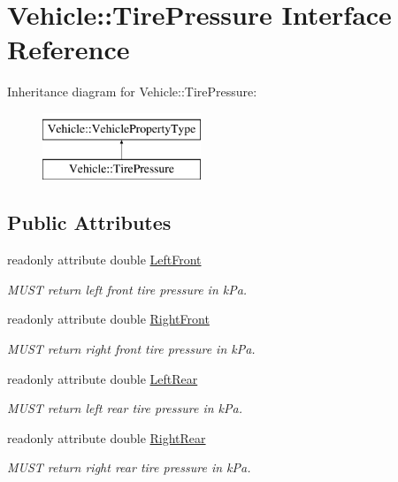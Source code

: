 \hypertarget{interfaceVehicle_1_1TirePressure}{\section{Vehicle\-:\-:Tire\-Pressure Interface Reference}
\label{interfaceVehicle_1_1TirePressure}
}
Inheritance diagram for Vehicle\-:\-:Tire\-Pressure\-:\begin{figure}[H]
\begin{center}
\leavevmode
\includegraphics[height=2.000000cm]{interfaceVehicle_1_1TirePressure}
\end{center}
\end{figure}
\subsection*{Public Attributes}
\begin{DoxyCompactItemize}
\item 
readonly attribute double \hyperlink{interfaceVehicle_1_1TirePressure_a6a8d57e9f5df937eff8f123d86f173e9}{Left\-Front}
\begin{DoxyCompactList}\small\item\em M\-U\-S\-T return left front tire pressure in k\-Pa. \end{DoxyCompactList}\item 
readonly attribute double \hyperlink{interfaceVehicle_1_1TirePressure_a483e1b18f534cde6240a33e5ae593df2}{Right\-Front}
\begin{DoxyCompactList}\small\item\em M\-U\-S\-T return right front tire pressure in k\-Pa. \end{DoxyCompactList}\item 
readonly attribute double \hyperlink{interfaceVehicle_1_1TirePressure_a8ef065b13e159d1c2059dc2623e8b754}{Left\-Rear}
\begin{DoxyCompactList}\small\item\em M\-U\-S\-T return left rear tire pressure in k\-Pa. \end{DoxyCompactList}\item 
readonly attribute double \hyperlink{interfaceVehicle_1_1TirePressure_aa94fbfbf3bcbff99ab294e5193dd9d2c}{Right\-Rear}
\begin{DoxyCompactList}\small\item\em M\-U\-S\-T return right rear tire pressure in k\-Pa. \end{DoxyCompactList}\end{DoxyCompactItemize}
